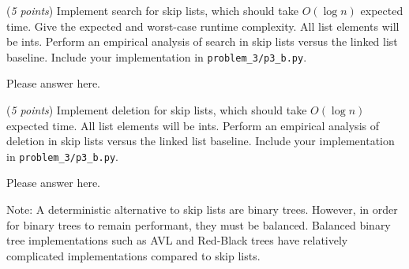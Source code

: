 \documentclass{hw}
\begin{document}
\begin{problem}
\begin{subproblem}
(\textit{5 points}) Implement search for skip lists, which should take $O(\log n)$ expected time.
Give the expected and worst-case runtime complexity.
All list elements will be ints.
Perform an empirical analysis of search in skip lists versus the linked list baseline.
Include your implementation in \texttt{problem\_3/p3\_b.py}.
\end{subproblem}
\begin{solution}
Please answer here.
\end{solution}


\begin{subproblem}
(\textit{5 points}) Implement deletion for skip lists, which should take $O(\log n)$ expected time.
All list elements will be ints.
Perform an empirical analysis of deletion in skip lists versus the linked list baseline.
Include your implementation in \texttt{problem\_3/p3\_b.py}.
\end{subproblem}
\begin{solution}
Please answer here.
\end{solution}


Note: A deterministic alternative to skip lists are binary trees.
However, in order for binary trees to remain performant,
they must be balanced. Balanced binary tree implementations such as
AVL and Red-Black trees have relatively complicated implementations compared to skip lists.

\end{problem}
\newpage

 
\end{document}
